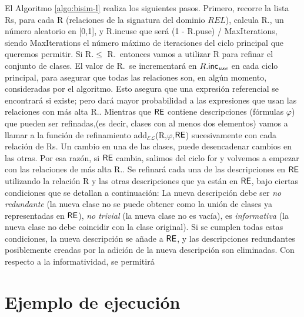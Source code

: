 El Algoritmo \ref{algo:bisim-l} realiza los siguientes pasos. Primero, recorre la lista Rs, para cada R (relaciones de la signatura del dominio $REL$), calcula R.\randomuse, un n\'umero aleatorio en [0,1], y R.incuse que ser\'a (1 - R.puse) / MaxIterations, siendo MaxIterations el n\'umero m\'aximo de iteraciones del ciclo principal que queremos permitir. Si R.\randomuse $\le$ R.\puse\ entonces vamos a utilizar R para refinar el conjunto de
clases. El valor de R.\puse\ se incrementar\'a en $R.\textsf{inc}_\emph{use}$
en cada ciclo principal, para asegurar que todas las relaciones son, en alg\'un momento,
consideradas por el algoritmo. Esto asegura que una expresi\'on referencial
se encontrar\'a si existe; pero dar\'a mayor probabilidad a las expresiones
que usan las relaciones con m\'as alta R.\puse. Mientras que $\textsf{RE}$ contiene descripciones (f\'ormulas $\varphi$) que pueden ser refinadas,(es decir, clases
con al menos dos elementos) vamos a llamar a la funci\'on de refinamiento
add$_\mathcal{EL}$(R,$\varphi$,$\textsf{RE}$) sucesivamente con cada relaci\'on
de Rs. Un cambio en una de las clases, puede desencadenar cambios en
las otras. Por esa raz\'on, si $\textsf{RE}$ cambia, salimos del ciclo for y volvemos a
empezar con las relaciones de m\'as alta R.\puse. Se refinar\'a cada una de las descripciones
en $\textsf{RE}$ utilizando la relaci\'on R y las otras descripciones que ya est\'an en
$\textsf{RE}$, bajo ciertas condiciones que se detallan a continuaci\'on: 
La nueva descripci\'on debe ser
\emph{no redundante} (la nueva clase no se puede obtener como la uni\'on de
clases ya representadas en $\textsf{RE}$), \emph{no trivial} (la nueva
clase no es vac\'{i}a), es \emph{informativa} (la nueva clase no debe
coincidir con la clase original). Si se cumplen todas estas condiciones,
la nueva descripci\'on se a\~nade a $\textsf{RE}$, y las descripciones redundantes
posiblemente creadas por la adici\'on de la nueva descripci\'on son
eliminadas.
Con respecto a la informatividad, se permitir\'a 

\section{Ejemplo de ejecuci\'on}
\label{sec:ejemplo_ejecucion}

